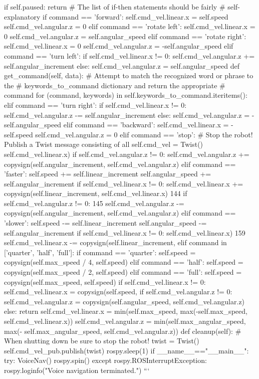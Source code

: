 if self.paused:
return
# The list of if-then statements should be fairly # self-explanatory
if command == 'forward':
self.cmd_vel.linear.x = self.speed self.cmd_vel.angular.z = 0
elif command == 'rotate left': self.cmd_vel.linear.x = 0 self.cmd_vel.angular.z = self.angular_speed
elif command == 'rotate right': self.cmd_vel.linear.x = 0 self.cmd_vel.angular.z = -self.angular_speed
elif command == 'turn left':
if self.cmd_vel.linear.x != 0:
self.cmd_vel.angular.z += self.angular_increment else:
self.cmd_vel.angular.z = self.angular_speed
def get_command(self, data):
# Attempt to match the recognized word or phrase to the
# keywords_to_command dictionary and return the appropriate # command
for (command, keywords) in
self.keywords_to_command.iteritems():
elif command == 'turn right':
if self.cmd_vel.linear.x != 0:
self.cmd_vel.angular.z -= self.angular_increment else:
self.cmd_vel.angular.z = -self.angular_speed
elif command == 'backward': self.cmd_vel.linear.x = -self.speed self.cmd_vel.angular.z = 0
elif command == 'stop':
# Stop the robot! Publish a Twist message consisting of all
self.cmd_vel = Twist()
self.cmd_vel.linear.x)
if self.cmd_vel.angular.z != 0:
self.cmd_vel.angular.z += copysign(self.angular_increment, self.cmd_vel.angular.z)
elif command == 'faster':
self.speed += self.linear_increment self.angular_speed += self.angular_increment if self.cmd_vel.linear.x != 0:
self.cmd_vel.linear.x += copysign(self.linear_increment,
self.cmd_vel.linear.x)
144 if self.cmd_vel.angular.z != 0:
145 self.cmd_vel.angular.z -= copysign(self.angular_increment, self.cmd_vel.angular.z)
elif command == 'slower':
self.speed -= self.linear_increment self.angular_speed -= self.angular_increment if self.cmd_vel.linear.x != 0:
self.cmd_vel.linear.x) 159
self.cmd_vel.linear.x -= copysign(self.linear_increment,
elif command in ['quarter', 'half', 'full']: if command == 'quarter':
self.speed = copysign(self.max_speed / 4, self.speed) elif command == 'half':
self.speed = copysign(self.max_speed / 2, self.speed) elif command == 'full':
self.speed = copysign(self.max_speed, self.speed) if self.cmd_vel.linear.x != 0:
self.cmd_vel.linear.x = copysign(self.speed,
if self.cmd_vel.angular.z != 0:
self.cmd_vel.angular.z = copysign(self.angular_speed, self.cmd_vel.angular.z)
else:
return
self.cmd_vel.linear.x = min(self.max_speed, max(-self.max_speed, self.cmd_vel.linear.x))
self.cmd_vel.angular.z = min(self.max_angular_speed, max(- self.max_angular_speed, self.cmd_vel.angular.z))
def cleanup(self):
# When shutting down be sure to stop the robot!
twist = Twist()
self.cmd_vel_pub.publish(twist)
rospy.sleep(1)
if __name__=="__main__":
try:
    VoiceNav()
rospy.spin()
except rospy.ROSInterruptException:
rospy.loginfo("Voice navigation terminated.")
```

